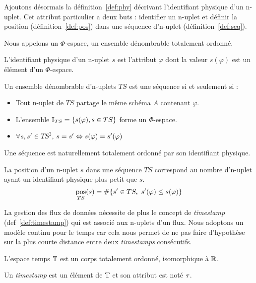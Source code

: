 Ajoutons désormais la définition~\ref{def:phy} décrivant l'identifiant physique d'un n-uplet. Cet attribut particulier a deux buts : identifier un n-uplet et définir la position (définition~\ref{def:pos}) dans une séquence d'n-uplet (définition~\ref{def:seq}).
\begin{defi}\label{def:phy}
    Nous appelons un $\Phi$-espace, un ensemble dénombrable totalement ordonné.

    L'identifiant physique d'un n-uplet $s$ est l'attribut $\varphi$ dont la valeur $s(\varphi)$ est un élément d'un $\Phi$-espace.
\end{defi}
\begin{defi}\label{def:seq}
    Un ensemble dénombrable d'n-uplets $TS$ est une séquence si et seulement si : 
    \begin{itemize}
     \item Tout n-uplet de $TS$ partage le même schéma $A$ contenant $\varphi$.
     \item L'ensemble $\mathbb{I}_{TS}=\{s(\varphi), s\in TS\}$ forme un $\Phi$-espace.
     \item $\forall s,s' \in TS^2$, $s = s' \Leftrightarrow s(\varphi) = s'(\varphi)$
    \end{itemize}

    Une séquence est naturellement totalement ordonné par son identifiant physique.
\end{defi}
\begin{defi}\label{def:pos}
    La position d'un n-uplet $s$ dans une séquence $TS$ correspond au nombre d'n-uplet ayant un identifiant physique plus petit que $s$.
    $$\mathop{\mathrm{pos}}_{TS}(s) = \#\{s'\in TS,\ s'(\varphi) \leq s(\varphi) \}$$
\end{defi}

La gestion des flux de données nécessite de plus le concept de \textit{timestamp} (def~\ref{def:timestamp}) qui est associé aux n-uplets d'un flux. Nous adoptons un modèle continu pour le temps car cela nous permet de ne pas faire d'hypothèse sur la plus courte distance entre deux \textit{timestamps} consécutifs.
\begin{defi}[Timestamp]\label{def:timestamp}
    L'espace temps $\mathbb{T}$ est un corps totalement ordonné, isomorphique à $\mathbb{R}$. 

    Un \textit{timestamp} est un élément de $\mathbb{T}$ et son attribut est noté $\tau$.
\end{defi}

